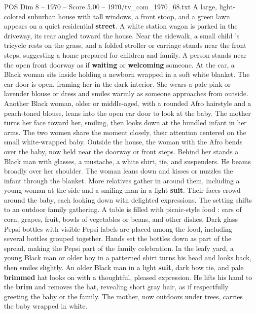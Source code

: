 \begin{textsample}{POS Dim 8 – 1970 – Score 5.00 – 1970/tv\_com\_1970\_68.txt}  \label{ex:f8_pos_039}
A large, light-colored suburban house with tall windows, a front stoop, and a green lawn appears on a quiet residential \textbf{street}.
A white station wagon is parked in the driveway, its rear angled toward the house.
Near the sidewalk, a small child ’s tricycle rests on the grass, and a folded stroller or carriage stands near the front steps, suggesting a home prepared for children and family.
A person stands near the open front doorway as if \textbf{waiting} or \textbf{welcoming} someone.
At the car, a Black woman sits inside holding a newborn wrapped in a soft white blanket.
The car door is open, framing her in the dark interior.
She wears a pale pink or lavender blouse or dress and smiles warmly as someone approaches from outside.
Another Black woman, older or middle-aged, with a rounded Afro hairstyle and a peach-toned blouse, leans into the open car door to look at the baby.
The mother turns her face toward her, smiling, then looks down at the bundled infant in her arms.
The two women share the moment closely, their attention centered on the small white-wrapped baby.
Outside the house, the woman with the Afro bends over the baby, now held near the doorway or front steps.
Behind her stands a Black man with glasses, a mustache, a white shirt, tie, and suspenders.
He beams broadly over her shoulder.
The woman leans down and kisses or nuzzles the infant through the blanket.
More relatives gather in around them, including a young woman at the side and a smiling man in a light \textbf{suit}.
Their faces crowd around the baby, each looking down with delighted expressions.
The setting shifts to an outdoor family gathering.
A table is filled with picnic-style food : ears of corn, grapes, fruit, bowls of vegetables or beans, and other dishes.
Dark glass Pepsi bottles with visible Pepsi labels are placed among the food, including several bottles grouped together.
Hands set the bottles down as part of the spread, making the Pepsi part of the family celebration.
In the leafy yard, a young Black man or older boy in a patterned shirt turns his head and looks back, then smiles slightly.
An older Black man in a light \textbf{suit}, dark bow tie, and pale \textbf{brimmed} hat looks on with a thoughtful, pleased expression.
He lifts his hand to the \textbf{brim} and removes the hat, revealing short gray hair, as if respectfully greeting the baby or the family.
The mother, now outdoors under trees, carries the baby wrapped in white.

\end{textsample}
